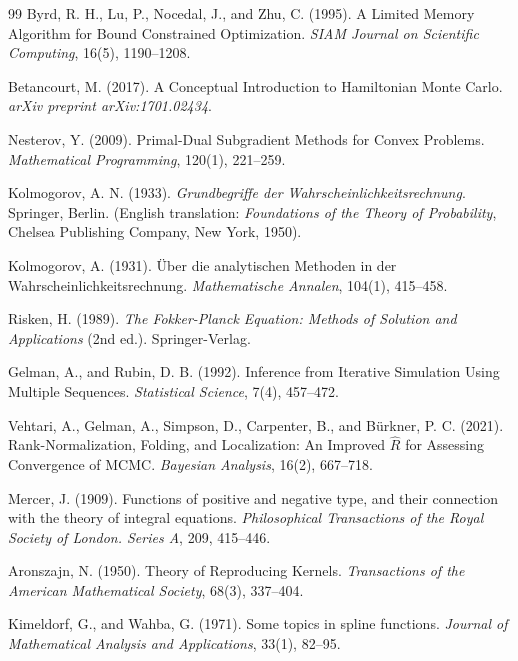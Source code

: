 \documentclass[12pt,oneside]{report}
\theoremstyle{definition}
\theoremstyle{remark}
\begin{document}
\begin{thebibliography}{99}
Byrd, R. H., Lu, P., Nocedal, J., and Zhu, C. (1995).
A Limited Memory Algorithm for Bound Constrained Optimization.
\textit{SIAM Journal on Scientific Computing}, 16(5), 1190--1208.

Betancourt, M. (2017).
A Conceptual Introduction to {Hamiltonian Monte Carlo}.
\textit{arXiv preprint arXiv:1701.02434}.

Nesterov, Y. (2009).
Primal-Dual Subgradient Methods for Convex Problems.
\textit{Mathematical Programming}, 120(1), 221--259.

Kolmogorov, A. N. (1933).
\textit{Grundbegriffe der Wahrscheinlichkeitsrechnung}.
Springer, Berlin. (English translation: \textit{Foundations of the Theory of Probability}, Chelsea Publishing Company, New York, 1950).

Kolmogorov, A. (1931).
\"Uber die analytischen Methoden in der Wahrscheinlichkeitsrechnung.
\textit{Mathematische Annalen}, 104(1), 415--458.

Risken, H. (1989).
\textit{The Fokker-Planck Equation: Methods of Solution and Applications} (2nd ed.).
Springer-Verlag.

Gelman, A., and Rubin, D. B. (1992).
Inference from Iterative Simulation Using Multiple Sequences.
\textit{Statistical Science}, 7(4), 457--472.

Vehtari, A., Gelman, A., Simpson, D., Carpenter, B., and B\"urkner, P. C. (2021).
Rank-Normalization, Folding, and Localization: An Improved $\hat{R}$ for Assessing Convergence of {MCMC}.
\textit{Bayesian Analysis}, 16(2), 667--718.

Mercer, J. (1909).
Functions of positive and negative type, and their connection with the theory of integral equations.
\textit{Philosophical Transactions of the Royal Society of London. Series A}, 209, 415--446.

Aronszajn, N. (1950).
Theory of Reproducing Kernels.
\textit{Transactions of the American Mathematical Society}, 68(3), 337--404.

Kimeldorf, G., and Wahba, G. (1971).
Some topics in spline functions.
\textit{Journal of Mathematical Analysis and Applications}, 33(1), 82--95.


\end{thebibliography}
\end{document}
